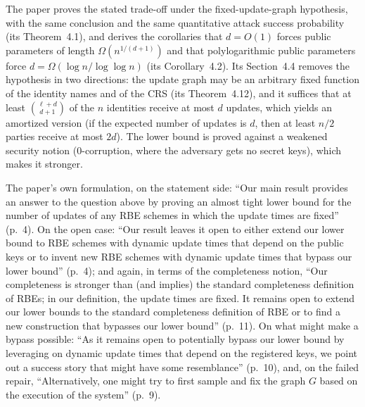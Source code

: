 \documentclass{aicr-conjecture}
\begin{document}
\begin{remark}\label{rem:progress}
The paper proves the stated trade-off under the fixed-update-graph
hypothesis, with the same conclusion and the same quantitative attack
success probability (its Theorem~4.1), and derives the corollaries that
$d = O(1)$ forces public parameters of length $\Omega(n^{1/(d+1)})$ and
that polylogarithmic public parameters force
$d = \Omega(\log n/\log\log n)$ (its Corollary~4.2). Its Section~4.4
removes the hypothesis in two directions: the update graph may be an
arbitrary fixed function of the identity names and of the CRS (its
Theorem~4.12), and it suffices that at least $\binom{\ell+d}{d+1}$ of
the $n$ identities receive at most $d$ updates, which yields an
amortized version (if the expected number of updates is $d$, then at
least $n/2$ parties receive at most $2d$). The lower bound is proved
against a weakened security notion ($0$-corruption, where the adversary
gets no secret keys), which makes it stronger.
\end{remark}

\begin{remark}[Openness]\label{rem:open}
The paper's own formulation, on the statement side: ``Our main result
provides an answer to the question above by proving an almost tight
lower bound for the number of updates of any RBE schemes in which the
update times are fixed'' (p.~4). On the open case: ``Our result leaves
it open to either extend our lower bound to RBE schemes with dynamic
update times that depend on the public keys or to invent new RBE schemes
with dynamic update times that bypass our lower bound'' (p.~4); and
again, in terms of the completeness notion, ``Our completeness is
stronger than (and implies) the standard completeness definition of
RBEs; in our definition, the update times are fixed. It remains open to
extend our lower bounds to the standard completeness definition of RBE
or to find a new construction that bypasses our lower bound'' (p.~11).
On what might make a bypass possible: ``As it remains open to
potentially bypass our lower bound by leveraging on dynamic update times
that depend on the registered keys, we point out a success story that
might have some resemblance'' (p.~10), and, on the failed repair,
``Alternatively, one might try to first sample and fix the graph $G$
based on the execution of the system'' (p.~9).
\end{remark}
\end{document}
